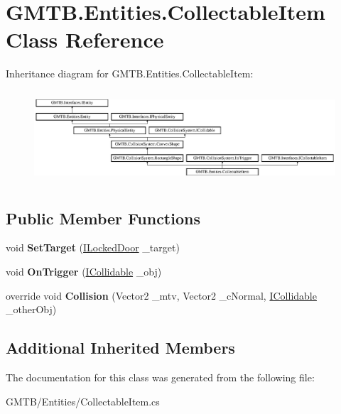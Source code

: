 \hypertarget{class_g_m_t_b_1_1_entities_1_1_collectable_item}{}\section{G\+M\+T\+B.\+Entities.\+Collectable\+Item Class Reference}
\label{class_g_m_t_b_1_1_entities_1_1_collectable_item}
Inheritance diagram for G\+M\+T\+B.\+Entities.\+Collectable\+Item\+:\begin{figure}[H]
\begin{center}
\leavevmode
\includegraphics[height=3.456790cm]{class_g_m_t_b_1_1_entities_1_1_collectable_item}
\end{center}
\end{figure}
\subsection*{Public Member Functions}
\begin{DoxyCompactItemize}
\item 
\mbox{\label{class_g_m_t_b_1_1_entities_1_1_collectable_item_a22114070d369972d9d4aff4c5a82aefe}} 
void {\bfseries Set\+Target} (\mbox{\hyperlink{interface_g_m_t_b_1_1_interfaces_1_1_i_locked_door}{I\+Locked\+Door}} \+\_\+target)
\item 
\mbox{\label{class_g_m_t_b_1_1_entities_1_1_collectable_item_a8682f8ee6658d1dc6ae12e269a9be158}} 
void {\bfseries On\+Trigger} (\mbox{\hyperlink{interface_g_m_t_b_1_1_collision_system_1_1_i_collidable}{I\+Collidable}} \+\_\+obj)
\item 
\mbox{\label{class_g_m_t_b_1_1_entities_1_1_collectable_item_ae71812623c4dc134a6094704b0c83346}} 
override void {\bfseries Collision} (Vector2 \+\_\+mtv, Vector2 \+\_\+c\+Normal, \mbox{\hyperlink{interface_g_m_t_b_1_1_collision_system_1_1_i_collidable}{I\+Collidable}} \+\_\+other\+Obj)
\end{DoxyCompactItemize}
\subsection*{Additional Inherited Members}


The documentation for this class was generated from the following file\+:\begin{DoxyCompactItemize}
\item 
G\+M\+T\+B/\+Entities/Collectable\+Item.\+cs\end{DoxyCompactItemize}
